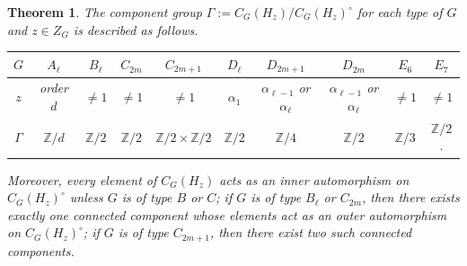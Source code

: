 \documentclass[11pt,oneside,dvipsnames]{amsart}
\theoremstyle{plain}
\newtheorem{Thm}{Theorem}
\theoremstyle{definition}
\theoremstyle{named}
\begin{document}
\begin{Thm}\label{Thm-Gamma-G-z}
The component group $\Gamma:=C_G(H_z)/C_G(H_z)^{\circ}$ for each type of $G$ and $z\in Z_G$ is described as follows.
\begin{center}
\begin{tabular}{|c|c|c|c|c|c|c|c|c|c|}
\hline
$G$ & $A_{\ell}$ & $B_{\ell}$ & $C_{2m}$ & $C_{2m+1}$ & $D_{\ell}$ & $D_{2m+1}$ & $D_{2m}$ & $E_6$ & $E_7$ \\
\hline
$z$ & order $d$ & $\ne 1$ & $\ne 1$ & $\ne1$ & $\alpha_1$ & $\alpha_{\ell-1}$ or $\alpha_{\ell}$ & $\alpha_{\ell-1}$ or $\alpha_{\ell}$ & $\ne1$ & $\ne1$ \\ 
\hline
$\Gamma$ & $\mathbb{Z}/d$ & $\mathbb{Z}/2$ & $\mathbb{Z}/2$ & $\mathbb{Z}/2\times\mathbb{Z}/2$ & $\mathbb{Z}/2$ & $\mathbb{Z}/4$ & $\mathbb{Z}/2$ & $\mathbb{Z}/3$ & $\mathbb{Z}/2$. \\
\hline
\end{tabular}
\end{center}
Moreover, every element of $C_G(H_z)$ acts as an inner automorphism on $C_G(H_z)^{\circ}$ unless $G$ is of type $B$ or $C$; if $G$ is of type $B_{\ell}$ or $C_{2m}$, then there exists exactly one connected component whose elements act as an outer automorphism on $C_G(H_z)^{\circ}$; if $G$ is of type $C_{2m+1}$, then there exist two such connected components.
\end{Thm}
\end{document}
